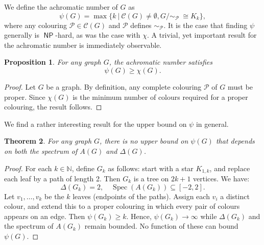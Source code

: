 \documentclass[12pt]{amsart}
\newcommand{\afunc}[1]{\operatorname{\mathsf{#1}}}
\numberwithin{figure}{section}
\theoremstyle{plain}
\newtheorem{theorem}{Theorem}[section]
\newtheorem{proposition}[theorem]{Proposition}
\begin{document}
\indent We define the achromatic number of $G$ as
\[\psi(G) = \max\{k\:|\:\mathscr{C}(G)\neq\emptyset, G/\!\sim_{\mathcal{P}}\:\cong K_{k}\},\]
where any colouring $\mathcal{P}\in\mathscr{C}(G)$ and $\mathcal{P}$ defines $\sim_{\mathcal{P}}$. It is the case that finding $\psi$ generally is $\afunc{NP}$-hard, as was the case with $\chi$. A trivial, yet important result for the achromatic number is immediately observable.
\begin{proposition}
    For any graph $G$, the achromatic number satisfies
    \[\psi(G) \geq \chi(G).\]
\end{proposition}
\begin{proof}
    Let $G$ be a graph. By definition, any complete colouring $\mathcal{P}$ of $G$ must be proper. Since $\chi(G)$ is the minimum number of colours required for a proper colouring, the result follows.
\end{proof}
\indent We find a rather interesting result for the upper bound on $\psi$ in general.
\begin{theorem}
For any graph $G$, there is no upper bound on $\psi(G)$ that depends on both the spectrum of $A(G)$ and $\Delta(G)$.
\end{theorem}
\begin{proof}
    For each $k \in \mathbb{N}$, define $G_{k}$ as follows: start with a star $K_{1,k}$, and replace each leaf by a path of length 2. Then $G_{k}$ is a tree on $2k + 1$ vertices. We have:
    \[\Delta(G_k) = 2, \quad \operatorname{Spec}(A(G_{k})) \subseteq [-2,2].\]
    Let $v_{1}, \dots, v_{k}$ be the $k$ leaves (endpoints of the paths). Assign each $v_{i}$ a distinct colour, and extend this to a proper colouring in which every pair of colours appears on an edge. Then $\psi(G_{k}) \geq k$. Hence, $\psi(G_{k}) \to \infty$ while $\Delta(G_{k})$ and the spectrum of $A(G_{k})$ remain bounded. No function of these can bound $\psi(G)$.
\end{proof}
\end{document}
